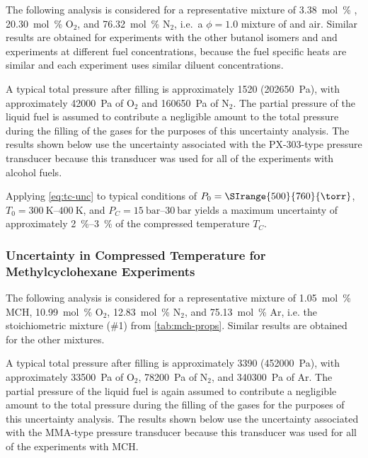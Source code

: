 \documentclass[../main.tex]{subfiles}
\begin{document}
The following analysis is considered for a representative mixture of
\SI{3.38}{\mole\percent} \tBuOH{}, \SI{20.30}{\mole\percent} O$_2$, and
\SI{76.32}{\mole\percent} N$_2$, i.e.\ a $\phi=1.0$ mixture of \tBuOH{}
and air. Similar results are obtained for experiments with the other butanol
isomers and \iPeOH{} and experiments at different fuel concentrations,
because the fuel specific heats are similar and each experiment uses
similar diluent concentrations.

A typical total pressure after filling is approximately
\SI{1520}{\torr} (\SI{202650}{\pascal}), with approximately
\SI{42000}{\pascal} of O$_2$ and \SI{160650}{\pascal} of N$_2$. The partial
pressure of the liquid fuel is assumed to contribute a negligible amount
to the total pressure during the filling of the gases for the purposes of
this uncertainty analysis. The results shown below use the
uncertainty associated with the PX-303-type pressure transducer because
this transducer was used for all of the experiments with alcohol fuels.

Applying \cref{eq:tc-unc} to typical conditions of $P_0 = \SIrange{500}{760}{\torr}$,
$T_0=\SIrange{300}{400}{\kelvin}$, and $P_C=\SIrange{15}{30}{\bar}$ yields
a maximum uncertainty of approximately \SIrange{2}{3}{\percent} of the
compressed temperature $T_C$.

\subsubsection{Uncertainty in Compressed Temperature for Methylcyclohexane Experiments}
\label{sec:unc-mch}

The following analysis is considered for a representative mixture of
\SI{1.05}{\mole\percent} MCH, \SI{10.99}{\mole\percent} O$_2$,
\SI{12.83}{\mole\percent} N$_2$, and \SI{75.13}{\mole\percent} Ar, i.e.
the stoichiometric mixture (\#1) from \cref{tab:mch-props}. Similar
results are obtained for the other mixtures.

A typical total pressure after filling is approximately
\SI{3390}{\torr} (\SI{452000}{\pascal}), with approximately
\SI{33500}{\pascal} of O$_2$, \SI{78200}{\pascal} of N$_2$, and
\SI{340300}{\pascal} of Ar. The partial pressure of the liquid fuel is
again assumed to contribute a negligible amount to the total pressure
during the filling of the gases for the purposes of this uncertainty
analysis. The results shown below use the uncertainty associated with
the MMA-type pressure transducer because this transducer was used for
all of the experiments with MCH.
\end{document}
